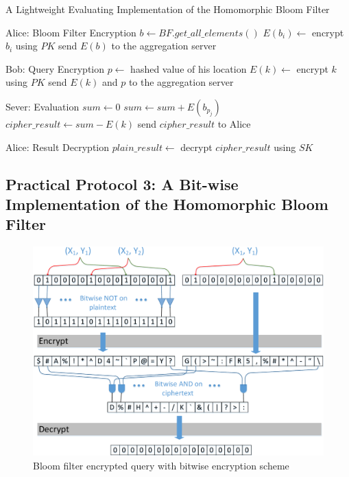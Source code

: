 \begin{algorithm}\small
\caption{A Lightweight Evaluating Implementation of the Homomorphic Bloom Filter}
\label{alg2}
\begin{algorithmic}[1]


\Statex Alice: Bloom Filter Encryption
\State $b \gets BF.get\_all\_elements()$
 
    \State $E(b_i) \gets$ encrypt $b_i$ using $PK$
\EndFor
\State send $E(b)$ to the aggregation server

\item[]

\Statex Bob: Query Encryption
\State $p \gets$ hashed value of his location
\State $E(k) \gets$ encrypt $k$ using $PK$
\State send $E(k)$ and $p$ to the aggregation server

\item[]

\Statex Sever: Evaluation
\State $sum \gets 0$
    \State $sum \gets sum + E(b_{p_j})$
\EndFor
\State $cipher\_result \gets sum - E(k)$
\State send $cipher\_result$ to Alice

\item[]

\Statex Alice: Result Decryption
\State $plain\_result \gets$ decrypt $cipher\_result$ using $SK$

\end{algorithmic}
\end{algorithm}


\subsection{Practical Protocol 3: A Bit-wise Implementation of the Homomorphic Bloom Filter}

\begin{figure}[t]
    \centering
    \includegraphics[width=0.8\linewidth]{figures/bitwise_bloomfilter.pdf}
    \caption{Bloom filter encrypted query with bitwise encryption scheme}
    \label{fig:bloomfilter_bitwise}
    \vspace{-0.1in}
\end{figure}


